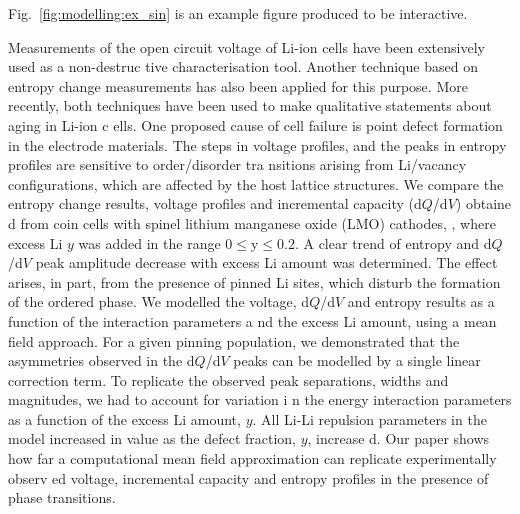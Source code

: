 {\color{green} Fig.~\ref{fig:modelling:ex_sin} is an example figure produced to be interactive.}    
                                                                                                    
Measurements of the open circuit voltage of Li-ion cells have been extensively used as a non-destruc
tive characterisation tool.                                                                         
Another technique based on entropy change measurements has also been applied for this purpose.      
More recently, both techniques have been used to make qualitative statements about aging in Li-ion c
ells.                                                                                               
One proposed cause of cell failure is point defect formation in the electrode materials.            
The steps in voltage profiles, and the peaks in entropy profiles are sensitive to order/disorder tra
nsitions arising from Li/vacancy configurations, which are affected by the host lattice structures. 
We compare the entropy change results, voltage profiles and incremental capacity (d$Q$/d$V$) obtaine
d from coin cells with spinel lithium manganese oxide (LMO) cathodes, ,     
where excess Li $y$ was added in the range $0 \leq $y$ \leq 0.2$.                                   
A clear trend of entropy and d$Q$/d$V$ peak amplitude decrease with excess Li amount was determined.
The effect arises, in part, from the presence of pinned Li sites, which disturb the formation of the
 ordered phase.                                                                                     
We modelled the voltage, d$Q$/d$V$ and entropy results as a function of the interaction parameters a
nd the excess Li amount, using a mean field approach.                                               
For a given pinning population, we demonstrated that the asymmetries observed in the d$Q$/d$V$ peaks
 can be modelled by a single linear correction term.                                                
To replicate the observed peak separations, widths and magnitudes, we had to account for variation i
n the energy interaction parameters as a function of the excess Li amount, $y$.                     
All Li-Li repulsion parameters in the model increased in value as the defect fraction, $y$, increase
d.                                                                                                  
Our paper shows how far a computational mean field approximation can replicate experimentally observ
ed voltage, incremental capacity and entropy profiles in the presence of phase transitions.